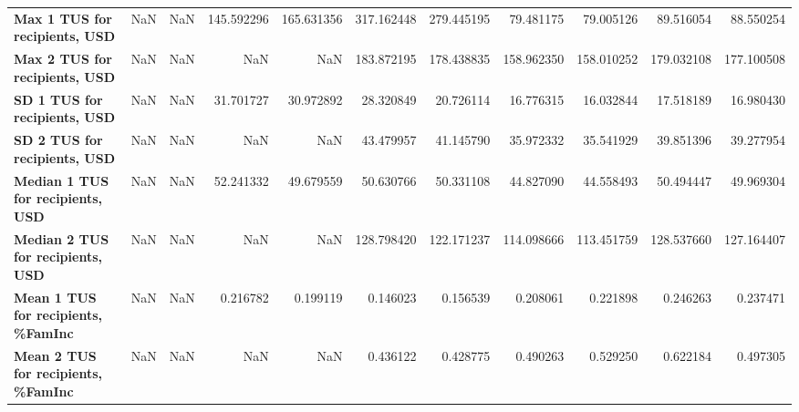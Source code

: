 \begin{longtable}{lrrrrrrrrrr}
\textbf{Max 1 TUS for recipients, USD     } &   NaN &   NaN &   145.592296 &    165.631356 &    317.162448 &    279.445195 &     79.481175 &     79.005126 &    89.516054 &    88.550254 \\
\textbf{Max 2 TUS for recipients, USD     } &   NaN &   NaN &          NaN &           NaN &    183.872195 &    178.438835 &    158.962350 &    158.010252 &   179.032108 &   177.100508 \\
\textbf{SD 1 TUS for recipients, USD      } &   NaN &   NaN &    31.701727 &     30.972892 &     28.320849 &     20.726114 &     16.776315 &     16.032844 &    17.518189 &    16.980430 \\
\textbf{SD 2 TUS for recipients, USD      } &   NaN &   NaN &          NaN &           NaN &     43.479957 &     41.145790 &     35.972332 &     35.541929 &    39.851396 &    39.277954 \\
\textbf{Median 1 TUS for recipients, USD  } &   NaN &   NaN &    52.241332 &     49.679559 &     50.630766 &     50.331108 &     44.827090 &     44.558493 &    50.494447 &    49.969304 \\
\textbf{Median 2 TUS for recipients, USD  } &   NaN &   NaN &          NaN &           NaN &    128.798420 &    122.171237 &    114.098666 &    113.451759 &   128.537660 &   127.164407 \\
\textbf{Mean 1 TUS for recipients, \%FamInc} &   NaN &   NaN &     0.216782 &      0.199119 &      0.146023 &      0.156539 &      0.208061 &      0.221898 &     0.246263 &     0.237471 \\
\textbf{Mean 2 TUS for recipients, \%FamInc} &   NaN &   NaN &          NaN &           NaN &      0.436122 &      0.428775 &      0.490263 &      0.529250 &     0.622184 &     0.497305 \\
\end{longtable}

